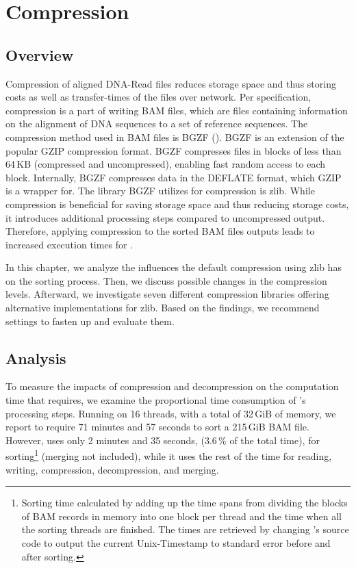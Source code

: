 \section{Compression}\label{compression}

\subsection{Overview}
Compression of aligned DNA-Read files reduces storage space and thus storing costs as well as transfer-times of the files over network. Per specification, compression is a part of writing BAM files, which are files containing information on the alignment of DNA sequences to a set of reference sequences. The compression method used in BAM files is BGZF (). BGZF is an extension of the popular GZIP compression format. BGZF compresses files in blocks of less than 64\,KB (compressed and uncompressed), enabling fast random access to each block. Internally, BGZF compresses data in the DEFLATE format, which GZIP is a wrapper for. The library BGZF utilizes for compression is zlib.
While compression is beneficial for saving storage space and thus reducing storage costs, it introduces additional processing steps compared to uncompressed output. Therefore, applying compression to the sorted BAM files \sort outputs leads to increased execution times for \sort.

In this chapter, we analyze the influences the default compression using zlib has on the sorting process. Then, we discuss possible changes in the compression levels. Afterward, we investigate seven different compression libraries offering alternative implementations for zlib. Based on the findings, we recommend settings to fasten up \sort and evaluate them.

\subsection{Analysis}
To measure the impacts of compression and decompression on the computation time that \sort requires, we examine the proportional time consumption of \sort's processing steps. 
Running on 16 threads, with a total of 32\,GiB of memory, we report \sort to require 71 minutes and 57 seconds to sort a 215\,GiB BAM file. However, \sort uses only 2 minutes and 35 seconds, (3.6\,\% of the total time), for sorting\footnote{Sorting time calculated by adding up the time spans from dividing the blocks of BAM records in memory into one block per thread and the time when all the sorting threads are finished. The times are retrieved by changing \sort's source code to output the current Unix-Timestamp to standard error before and after sorting.} (merging not included), while it uses the rest of the time for reading, writing, compression, decompression, and merging.

